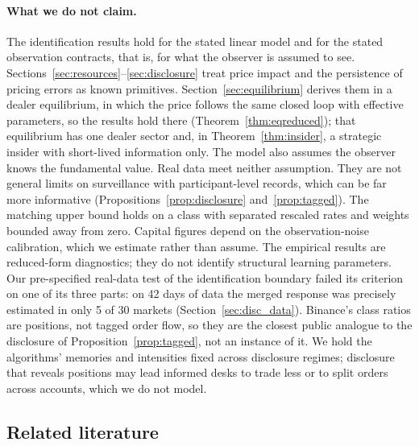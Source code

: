 \documentclass[12pt]{article}
\theoremstyle{definition}
\theoremstyle{remark}
\begin{document}
\paragraph{What we do not claim.} The identification results hold for the stated linear model and for the stated observation contracts, that is, for what the observer is assumed to see. Sections~\ref{sec:resources}--\ref{sec:disclosure} treat price impact and the persistence of pricing errors as known primitives. Section~\ref{sec:equilibrium} derives them in a dealer equilibrium, in which the price follows the same closed loop with effective parameters, so the results hold there (Theorem~\ref{thm:eqreduced}); that equilibrium has one dealer sector and, in Theorem~\ref{thm:insider}, a strategic insider with short-lived information only. The model also assumes the observer knows the fundamental value. Real data meet neither assumption. They are not general limits on surveillance with participant-level records, which can be far more informative (Propositions~\ref{prop:disclosure} and~\ref{prop:tagged}). The matching upper bound holds on a class with separated rescaled rates and weights bounded away from zero. Capital figures depend on the observation-noise calibration, which we estimate rather than assume. The empirical results are reduced-form diagnostics; they do not identify structural learning parameters. Our pre-specified real-data test of the identification boundary failed its criterion on one of its three parts: on 42 days of data the merged response was precisely estimated in only 5 of 30 markets (Section~\ref{sec:disc_data}). Binance's class ratios are positions, not tagged order flow, so they are the closest public analogue to the disclosure of Proposition~\ref{prop:tagged}, not an instance of it. We hold the algorithms' memories and intensities fixed across disclosure regimes; disclosure that reveals positions may lead informed desks to trade less or to split orders across accounts, which we do not model.

\subsection{Related literature}\label{sec:lit}
\end{document}
